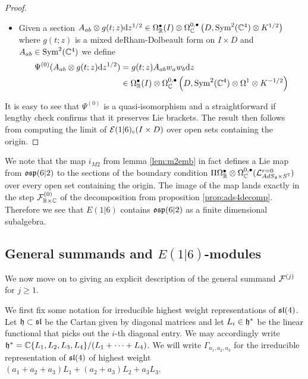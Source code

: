 \begin{proof}
\begin{itemize}
\item Given a section 
$A_{ab} \otimes g(t; z)\mathrm{d} z^{1/2} \in \Omega^\bullet_{\mathbb{R}} (I)\otimes \Omega^{0,\bullet}_{\mathbb{C}} \left (D, \text{Sym}^2 (\mathbb{C}^4) \otimes K^{1/2}\right )$ where $g(t;z)$ is a mixed deRham-Dolbeault form on $I\times D$ and $A_{ab} \in \text{Sym}^2 (\mathbb{C}^4)$ we define
\begin{align*}
\Psi^{(0)} (A_{ab} \otimes g(t; z)\mathrm{d} z^{1/2}) &= g(t;z)  A_{ab} w_a w_b \mathrm{d} z \\
&\in \Omega^\bullet_{\mathbb{R}} (I) \otimes \Omega^{0,\bullet}_{\mathbb{C}} \left ( D, \text{Sym}^2 (\mathbb{C}^4) \otimes \Omega^1 \otimes K^{-1/2} \right )
\end{align*}
\end{itemize}
It is easy to see that $\Psi^{(0)}$ is a quasi-isomorphism and a straightforward if lengthy check confirms that it preserves Lie brackets. The result then follows from computing the limit of $\mathcal{E}(1|6)_c (I\times D)$ over open sets containing the origin. 
\end{proof}

\begin{rmk}
We note that the map $i_{M2}$ from lemma \ref{lem:m2emb} in fact defines a Lie map from $\mathfrak{osp}(6|2)$ to the sections of the boundary condition $\Pi \Omega^\bullet_{\mathbb{R}}\otimes \Omega^{0,\bullet}_{\mathbb{C}} (\mathcal{L}^{r=0}_{AdS_4\times S^7} )$ over every open set containing the origin. The image of the map lands exactly in the step $\mathcal{F}^{(0)}_{\mathbb{R}\times \mathbb{C}}$ of the decomposition from proposition \ref{prop:ads4decomp}. Therefore we see that $E(1|6)$ contains $\mathfrak{osp}(6|2)$ as a finite dimensional subalgebra.  
\end{rmk}

\subsection{General summands and $E(1|6)$-modules}
We now move on to giving an explicit description of the general summand $\mathcal{F}^{(j)}$ for $j \geq 1$. 

We first fix some notation for irreducible highest weight representations of $\mathfrak{sl}(4)$. Let $\mathfrak{h}\subset \mathfrak{sl}$ be the Cartan given by diagonal matrices and let $L_i\in \mathfrak{h}^*$ be the linear functional that picks out the $i$-th diagonal entry. We may accordingly write $\mathfrak{h}^* = \mathbb{C} \{L_1, L_2, L_3, L_4\}/(L_1+\cdots + L_4)$. We will write $\Gamma_{a_1,a_2, a_3}$ for the irreducible representation of $\mathfrak{sl}(4)$ of highest weight $(a_1+a_2+a_3)L_1+(a_2+a_3)L_2 + a_3L_3$. 

